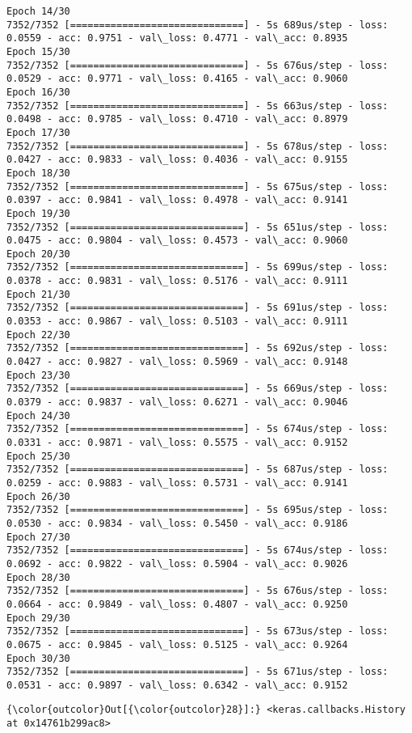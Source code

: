 \documentclass[11pt]{article}
\begin{document}
\begin{Verbatim}[commandchars=\\\{\}]
Epoch 14/30
7352/7352 [==============================] - 5s 689us/step - loss: 0.0559 - acc: 0.9751 - val\_loss: 0.4771 - val\_acc: 0.8935
Epoch 15/30
7352/7352 [==============================] - 5s 676us/step - loss: 0.0529 - acc: 0.9771 - val\_loss: 0.4165 - val\_acc: 0.9060
Epoch 16/30
7352/7352 [==============================] - 5s 663us/step - loss: 0.0498 - acc: 0.9785 - val\_loss: 0.4710 - val\_acc: 0.8979
Epoch 17/30
7352/7352 [==============================] - 5s 678us/step - loss: 0.0427 - acc: 0.9833 - val\_loss: 0.4036 - val\_acc: 0.9155
Epoch 18/30
7352/7352 [==============================] - 5s 675us/step - loss: 0.0397 - acc: 0.9841 - val\_loss: 0.4978 - val\_acc: 0.9141
Epoch 19/30
7352/7352 [==============================] - 5s 651us/step - loss: 0.0475 - acc: 0.9804 - val\_loss: 0.4573 - val\_acc: 0.9060
Epoch 20/30
7352/7352 [==============================] - 5s 699us/step - loss: 0.0378 - acc: 0.9831 - val\_loss: 0.5176 - val\_acc: 0.9111
Epoch 21/30
7352/7352 [==============================] - 5s 691us/step - loss: 0.0353 - acc: 0.9867 - val\_loss: 0.5103 - val\_acc: 0.9111
Epoch 22/30
7352/7352 [==============================] - 5s 692us/step - loss: 0.0427 - acc: 0.9827 - val\_loss: 0.5969 - val\_acc: 0.9148
Epoch 23/30
7352/7352 [==============================] - 5s 669us/step - loss: 0.0379 - acc: 0.9837 - val\_loss: 0.6271 - val\_acc: 0.9046
Epoch 24/30
7352/7352 [==============================] - 5s 674us/step - loss: 0.0331 - acc: 0.9871 - val\_loss: 0.5575 - val\_acc: 0.9152
Epoch 25/30
7352/7352 [==============================] - 5s 687us/step - loss: 0.0259 - acc: 0.9883 - val\_loss: 0.5731 - val\_acc: 0.9141
Epoch 26/30
7352/7352 [==============================] - 5s 695us/step - loss: 0.0530 - acc: 0.9834 - val\_loss: 0.5450 - val\_acc: 0.9186
Epoch 27/30
7352/7352 [==============================] - 5s 674us/step - loss: 0.0692 - acc: 0.9822 - val\_loss: 0.5904 - val\_acc: 0.9026
Epoch 28/30
7352/7352 [==============================] - 5s 676us/step - loss: 0.0664 - acc: 0.9849 - val\_loss: 0.4807 - val\_acc: 0.9250
Epoch 29/30
7352/7352 [==============================] - 5s 673us/step - loss: 0.0675 - acc: 0.9845 - val\_loss: 0.5125 - val\_acc: 0.9264
Epoch 30/30
7352/7352 [==============================] - 5s 671us/step - loss: 0.0531 - acc: 0.9897 - val\_loss: 0.6342 - val\_acc: 0.9152

    \end{Verbatim}

\begin{Verbatim}[commandchars=\\\{\}]
{\color{outcolor}Out[{\color{outcolor}28}]:} <keras.callbacks.History at 0x14761b299ac8>
\end{Verbatim}
            
\end{document}
